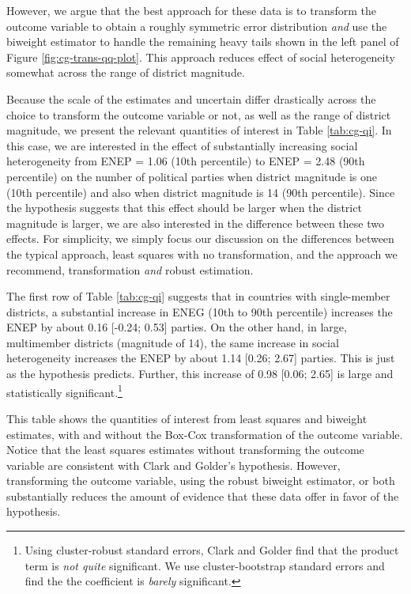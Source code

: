 \documentclass[12pt]{article}
\begin{document}
However, we argue that the best approach for these data is to transform the outcome variable to obtain a roughly symmetric error distribution \textit{and} use the biweight estimator to handle the remaining heavy tails shown in the left panel of Figure \ref{fig:cg-trans-qq-plot}. 
This approach reduces effect of social heterogeneity somewhat across the range of district magnitude.

Because the scale of the estimates and uncertain differ drastically across the choice to transform the outcome variable or not, as well as the range of district magnitude, we present the relevant quantities of interest in Table \ref{tab:cg-qi}. 
In this case, we are interested in the effect of substantially increasing social heterogeneity from ENEP = 1.06 (10th percentile) to ENEP = 2.48 (90th percentile) on the number of political parties when district magnitude is one (10th percentile) and also when district magnitude is 14 (90th percentile). 
Since the hypothesis suggests that this effect should be larger when the district magnitude is larger, we are also interested in the difference between these two effects. 
For simplicity, we simply focus our discussion on the differences between the typical approach, least squares with no transformation, and the approach we recommend, transformation \textit{and} robust estimation.

The first row of Table \ref{tab:cg-qi} suggests that in countries with single-member districts, a substantial increase in ENEG (10th to 90th percentile) increases the ENEP by about 0.16 [-0.24; 0.53] parties. 
On the other hand, in large, multimember districts (magnitude of 14), the same increase in social heterogeneity increases the ENEP by about 1.14 [0.26; 2.67] parties. 
This is just as the hypothesis predicts. 
Further, this increase of 0.98 [0.06; 2.65] is large and statistically significant.\footnote{Using cluster-robust standard errors, Clark and Golder find that the product term is \textit{not quite} significant. We use cluster-bootstrap standard errors and find the the coefficient is \textit{barely} significant.}

\begin{table}[h!]
{\scriptsize

}
\caption{This table shows the quantities of interest from least squares and biweight estimates, with and without the Box-Cox transformation of the outcome variable. 
Notice that the least squares estimates without transforming the outcome variable are consistent with Clark and Golder's hypothesis. 
However, transforming the outcome variable, using the robust biweight estimator,  or both substantially reduces the amount of evidence that these data offer in favor of the hypothesis.}\label{tab:cg-qi}
\end{table}
\end{document}
